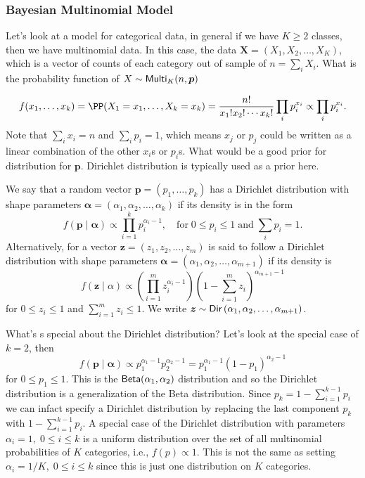 \subsubsection*{Bayesian Multinomial Model}

Let's look at a model for categorical data, in general if we have $K \geq 2$ classes, then we have multinomial data. In this case, the data $\bm{X} = (X_1 , X_2 , \ldots , X_K)$, which is a vector of counts of each category out of sample of $n = \sum_i X_i$. What is the probability function of $X \sim {\sf Multi}_K (n,\bm{p})$

\[
    f (x_1 , \ldots , x_k) = \PP (X_1 = x_1, \ldots , X_k = x_k) =
    \frac{n!}{x_1 ! x_2 ! \cdots x_k !} \prod_i p_i^{x_i} \propto \prod_i p_i^{x_i}.
\]
Note that $\sum_i x_i = n$ and $\sum_i p_i = 1$, which means $x_j$ or $p_j$ could be written as a linear combination of the other $x_i$s or $p_i$s. What would be a good prior for distribution for $\bm{p}$. Dirichlet distribution is typically used as a prior here.

\begin{defe}
    We say that a random vector $\bm{p} = \left( p_1 , \ldots , p_k \right)$ has a Dirichlet distribution with shape parameters $\bm{\alpha} = \left( \alpha_1 , \alpha_2 , \ldots, \alpha_k \right)$ if its density is in the form
    \[
        f(\bm{p} \mid \bm{\alpha}) \propto \prod_{i=1}^k p_i^{\alpha_i - 1} , \quad \text{for} \; 0 \leq p_i \leq 1 \; \text{and} \; \sum_i p_i =1.
    \]
    Alternatively, for a vector $\bm{z} = \left( z_1 , z_2 , \ldots , z_m \right)$ is said to follow a Dirichlet distribution with shape parameters $\bm{\alpha} = (\alpha_1, \alpha_2 , \ldots , \alpha_{m+1})$ if its density is
    \[
        f(\bm{z} \mid \alpha) \propto \left( \prod_{i=1}^m z_i^{\alpha_i - 1} \right) \left( 1 - \sum_{i=1}^m z_i \right)^{\alpha_{m+1} - 1}
    \]
    for $0 \leq z_i \leq 1$ and $\sum_{i=1}^{m} z_i \leq 1$. We write $\bm{z} \sim {\sf Dir} \left( \alpha_1 , \alpha_2 , \ldots , \alpha_{m+1} \right)$.
\end{defe}
What's s special about the Dirichlet distribution? Let's look at the special case of $k=2$, then
\[
    f(\bm{p} \mid \bm{\alpha}) \propto p_1^{\alpha_1 - 1} p_2^{\alpha_2 - 1} = p_1^{\alpha_1 - 1} (1-p_1)^{\alpha_2 - 1}
\]
for $0 \leq p_1 \leq 1$. This is the ${\sf Beta} (\alpha_1 , \alpha_2)$ distribution and so the Dirichlet distribution is a generalization of the Beta distribution. Since $p_k = 1 - \sum_{i=1}^{k-1} p_i$ we can infact specify a Dirichlet distribution by replacing the last component $p_k$ with $1 - \sum_{i=1}^{k-1} p_i$. A special case of the Dirichlet distribution with parameters $\alpha_i = 1, \; 0 \leq i \leq k$ is a uniform distribution over the set of all multinomial probabilities of $K$ categories, i.e., $f(p) \propto 1$. This is not the same as setting $\alpha_i = 1/K, \; 0 \leq i \leq k$ since this is just one distribution on $K$ categories.

